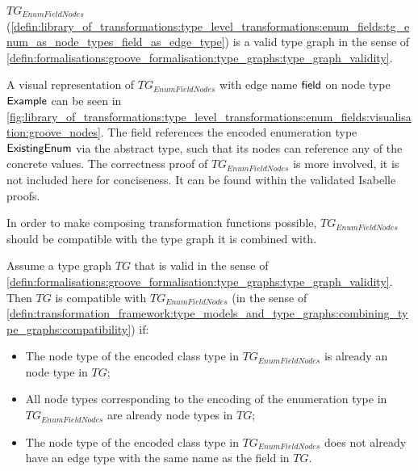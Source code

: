 \begin{thm}
\label{defin:library_of_transformations:type_level_transformations:enum_fields:tg_enum_as_node_types_field_as_edge_type_correct}
$TG_{EnumFieldNodes}$ (\cref{defin:library_of_transformations:type_level_transformations:enum_fields:tg_enum_as_node_types_field_as_edge_type}) is a valid type graph in the sense of \cref{defin:formalisations:groove_formalisation:type_graphs:type_graph_validity}.
\end{thm}

A visual representation of $TG_{EnumFieldNodes}$ with edge name $\mathsf{field}$ on node type $\mathsf{Example}$ can be seen in \cref{fig:library_of_transformations:type_level_transformations:enum_fields:visualisation:groove_nodes}. The field references the encoded enumeration type $\mathsf{ExistingEnum}$ via the abstract type, such that its nodes can reference any of the concrete values. The correctness proof of $TG_{EnumFieldNodes}$ is more involved, it is not included here for conciseness. It can be found within the validated Isabelle proofs.

In order to make composing transformation functions possible, $TG_{EnumFieldNodes}$ should be compatible with the type graph it is combined with.

\begin{thm}
\label{defin:library_of_transformations:type_level_transformations:enum_fields:tg_enum_as_node_types_field_as_edge_type_combine_correct}
Assume a type graph $TG$ that is valid in the sense of \cref{defin:formalisations:groove_formalisation:type_graphs:type_graph_validity}. Then $TG$ is compatible with $TG_{EnumFieldNodes}$ (in the sense of \cref{defin:transformation_framework:type_models_and_type_graphs:combining_type_graphs:compatibility}) if:
\begin{itemize}
    \item The node type of the encoded class type in $TG_{EnumFieldNodes}$ is already an node type in $TG$;
    \item All node types corresponding to the encoding of the enumeration type in $TG_{EnumFieldNodes}$ are already node types in $TG$;
    \item The node type of the encoded class type in $TG_{EnumFieldNodes}$ does not already have an edge type with the same name as the field in $TG$.
\end{itemize}
\end{thm}

